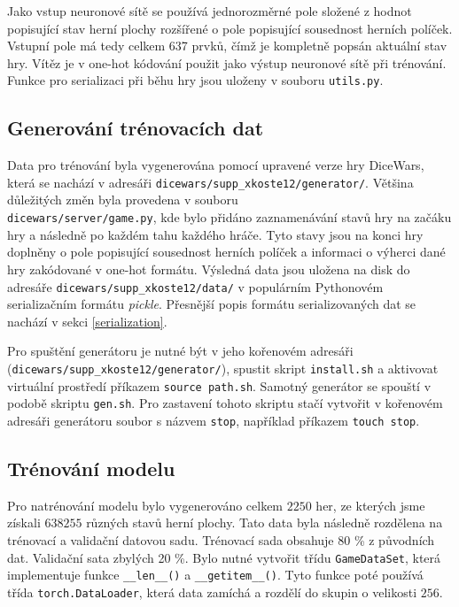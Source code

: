 \documentclass[a4paper,11pt]{article}
\begin{document}
		Jako vstup neuronové sítě se používá jednorozměrné pole složené z hodnot popisující stav herní plochy rozšířené o pole popisující sousednost herních políček. Vstupní pole má tedy celkem 637 prvků, čímž je kompletně popsán aktuální stav hry. Vítěz je v one-hot kódování použit jako výstup neuronové sítě při trénování. Funkce pro serializaci při běhu hry jsou uloženy v souboru \texttt{utils.py}.
	
		\subsection{Generování trénovacích dat}
		Data pro trénování byla vygenerována pomocí upravené verze hry DiceWars, která se nachází v adresáři \texttt{dicewars/supp\_xkoste12/generator/}. Většina důležitých změn byla provedena v souboru\\\texttt{dicewars/server/game.py}, kde bylo přidáno zaznamenávání stavů hry na začáku hry a následně po každém tahu každého hráče. Tyto stavy jsou na konci hry doplněny o pole popisující sousednost herních políček a informaci o výherci dané hry zakódované v one-hot formátu. Výsledná data jsou uložena na disk do adresáře \texttt{dicewars/supp\_xkoste12/data/} v populárním Pythonovém serializačním formátu \emph{pickle}. Přesnější popis formátu serializovaných dat se nachází v sekci \ref{serialization}.
		
		Pro spuštění generátoru je nutné být v jeho kořenovém adresáři\\(\texttt{dicewars/supp\_xkoste12/generator/}), spustit skript \texttt{install.sh} a aktivovat virtuální prostředí příkazem \texttt{source path.sh}. Samotný generátor se spouští v podobě skriptu \texttt{gen.sh}. Pro zastavení tohoto skriptu stačí vytvořit v kořenovém adresáři generátoru soubor s názvem \texttt{stop}, například příkazem \texttt{touch stop}.
	
	\subsection{Trénování modelu}
		Pro natrénování modelu bylo vygenerováno celkem $2250$ her, ze kterých jsme získali $638 255$ různých stavů herní plochy. Tato data byla následně rozdělena na trénovací a validační datovou sadu. Trénovací sada obsahuje 80 \% z původních dat. Validační sata zbylých 20 \%. Bylo nutné vytvořit třídu \texttt{GameDataSet}, která implementuje funkce \texttt{\_\_len\_\_()} a \texttt{\_\_getitem\_\_()}. Tyto funkce poté používá třída \texttt{torch.DataLoader}, která data zamíchá a rozdělí do skupin o velikosti $256$.
		
\end{document}
